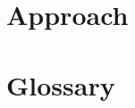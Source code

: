 \documentclass{grantplate}
\begin{document}


\cleardoublepage




\section{Approach}






\clearpage
\section*{Glossary}
\printglossaries

\clearpage
\printbibliography
\end{document}

